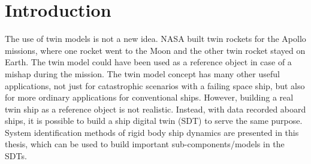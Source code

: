 \chapter{Introduction}
The use of twin models is not a new idea. NASA built twin rockets for the Apollo missions, where one rocket went to the Moon and the other twin rocket stayed on Earth.
The twin model could have been used as a reference object in case of a mishap during the mission.  
The twin model concept has many other useful applications, not just for catastrophic scenarios with a failing space ship, but also for more ordinary applications for conventional ships. However, building a real twin ship as a reference object is not realistic. Instead, with data recorded aboard ships, it is possible to build a ship digital twin (SDT) to serve the same purpose.
System identification methods of rigid body ship dynamics are presented in this thesis, which can be used to build important sub-components/models in the SDTs. 

